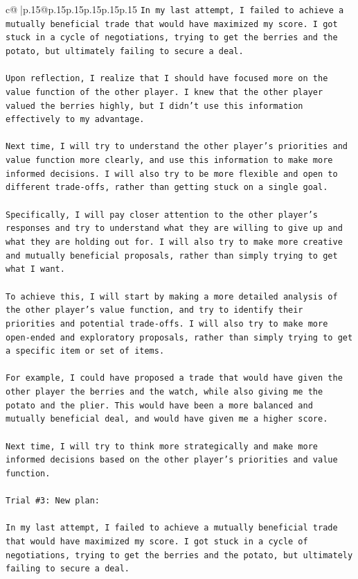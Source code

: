 \documentclass{article}
\begin{document}
{\begin{supertabular}{c@{$\;$}|p{.15\linewidth}@{}p{.15\linewidth}p{.15\linewidth}p{.15\linewidth}p{.15\linewidth}p{.15\linewidth}}
{{{\texttt{In my last attempt, I failed to achieve a mutually beneficial trade that would have maximized my score. I got stuck in a cycle of negotiations, trying to get the berries and the potato, but ultimately failing to secure a deal. } \\
\\ 
\texttt{Upon reflection, I realize that I should have focused more on the value function of the other player. I knew that the other player valued the berries highly, but I didn't use this information effectively to my advantage. } \\
\\ 
\texttt{Next time, I will try to understand the other player's priorities and value function more clearly, and use this information to make more informed decisions. I will also try to be more flexible and open to different trade{-}offs, rather than getting stuck on a single goal. } \\
\\ 
\texttt{Specifically, I will pay closer attention to the other player's responses and try to understand what they are willing to give up and what they are holding out for. I will also try to make more creative and mutually beneficial proposals, rather than simply trying to get what I want. } \\
\\ 
\texttt{To achieve this, I will start by making a more detailed analysis of the other player's value function, and try to identify their priorities and potential trade{-}offs. I will also try to make more open{-}ended and exploratory proposals, rather than simply trying to get a specific item or set of items. } \\
\\ 
\texttt{For example, I could have proposed a trade that would have given the other player the berries and the watch, while also giving me the potato and the plier. This would have been a more balanced and mutually beneficial deal, and would have given me a higher score. } \\
\\ 
\texttt{Next time, I will try to think more strategically and make more informed decisions based on the other player's priorities and value function.} \\
\\ 
\texttt{Trial \#3: New plan: } \\
\\ 
\texttt{In my last attempt, I failed to achieve a mutually beneficial trade that would have maximized my score. I got stuck in a cycle of negotiations, trying to get the berries and the potato, but ultimately failing to secure a deal. } \\
}}}
\end{supertabular}}
\end{document}
